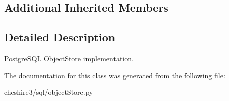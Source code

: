 \subsection*{Additional Inherited Members}


\subsection{Detailed Description}
\begin{DoxyVerb}PostgreSQL ObjectStore implementation.\end{DoxyVerb}
 

The documentation for this class was generated from the following file\-:\begin{DoxyCompactItemize}
\item 
cheshire3/sql/object\-Store.\-py\end{DoxyCompactItemize}

